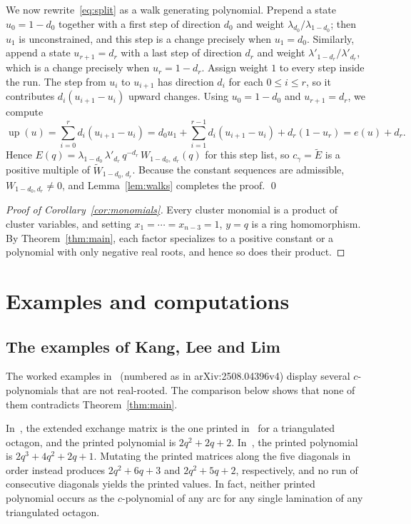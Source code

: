 \documentclass[11pt]{amsart}
\theoremstyle{remark}
\numberwithin{equation}{section}
\newcommand{\up}{\operatorname{up}}
\begin{document}
We now rewrite~\eqref{eq:split} as a walk generating polynomial. Prepend a
state $u_0=1-d_0$ together with a first step of direction $d_0$ and weight
$\lambda_{d_0}/\lambda_{1-d_0}$; then $u_1$ is unconstrained, and this step is
a change precisely when $u_1=d_0$. Similarly, append a state $u_{r+1}=d_r$ with
a last step of direction $d_r$ and weight $\lambda'_{1-d_r}/\lambda'_{d_r}$,
which is a change precisely when $u_r=1-d_r$. Assign weight $1$ to every step
inside the run. The step from $u_i$ to $u_{i+1}$ has direction $d_i$ for each
$0\le i\le r$, so it contributes $d_i(u_{i+1}-u_i)$ upward changes. Using
$u_0=1-d_0$ and $u_{r+1}=d_r$, we compute
\[
\up(u)=\sum_{i=0}^{r}d_i(u_{i+1}-u_i)=d_0u_1+\sum_{i=1}^{r-1}d_i(u_{i+1}-u_i)+d_r(1-u_r)
=e(u)+d_r.
\]
Hence $E(q)=\lambda_{1-d_0}\,\lambda'_{d_r}\,q^{-d_r}\,W_{1-d_0,\,d_r}(q)$ for
this step list, so $c_\gamma=\widetilde E$ is a positive multiple of
$\widetilde W_{1-d_0,\,d_r}$. Because the constant sequences are admissible,
$W_{1-d_0,d_r}\ne0$, and Lemma~\ref{lem:walks} completes the proof.
\qed

\begin{proof}[Proof of Corollary~\ref{cor:monomials}]
Every cluster monomial is a product of cluster variables, and setting
$x_1=\cdots=x_{n-3}=1$, $y=q$ is a ring homomorphism. By
Theorem~\ref{thm:main}, each factor specializes to a positive constant or a
polynomial with only negative real roots, and hence so does their product.
\end{proof}

\section{Examples and computations}\label{sec:examples}

\subsection{The examples of Kang, Lee and Lim}
The worked examples in~\cite[Section~5.1]{KLL} (numbered as in
arXiv:2508.04396v4) display several $c$-polynomials that are not real-rooted.
The comparison below shows that none of them contradicts
Theorem~\ref{thm:main}.

In~\cite[Example~3]{KLL}, the extended exchange matrix is the one printed
in~\cite[Example~2]{KLL} for a triangulated octagon, and the printed polynomial
is $2q^2+2q+2$. In~\cite[Example~4]{KLL}, the printed polynomial is
$2q^3+4q^2+2q+1$. Mutating the printed matrices along the five diagonals in
order instead produces $2q^2+6q+3$ and $2q^2+5q+2$, respectively, and no run of
consecutive diagonals yields the printed values. In fact, neither printed
polynomial occurs as the $c$-polynomial of any arc for any single lamination of
any triangulated octagon.
\end{document}
